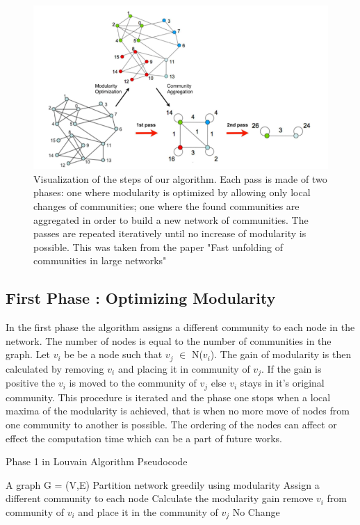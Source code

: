  \begin{figure}[h]

\includegraphics[scale=0.5]{loustep.png}
\caption{\label{loupic} Visualization of the steps of our algorithm. Each pass is made of two phases:
one where modularity is optimized by allowing only local changes of communities;
one where the found communities are aggregated in order to build a new network of
communities. The passes are repeated iteratively until no increase of modularity is
possible. This was taken from the paper "Fast unfolding of communities in large networks" \cite{louvain}}
\centering
\end{figure}

\subsection{First Phase : Optimizing Modularity}
In the first phase the algorithm assigns a different community to each node in the network.  The number of nodes is equal to the number of communities in the graph. Let $v_i$ be be a node such that $v_j$ $\in$ N($v_i$). The gain of modularity is then calculated by removing $v_i$ and placing it in community of $v_j$. If the gain is positive the $v_i$ is moved to the community of $v_j$ else $v_i$ stays in it's original community. This procedure is iterated and the phase one stops when a local maxima of the modularity is achieved, that is when no more move of nodes from one community to another is possible. The ordering of the nodes can affect or effect the computation time which can be a part of future works. 

\begin{algorithm}[H]
\caption{Phase 1 in Louvain Algorithm Pseudocode}
\begin{algorithmic} 
\REQUIRE A graph G = (V,E)
\ENSURE Partition network greedily using modularity
\STATE Assign a different community to each node
\STATE Calculate the modularity gain
\STATE remove $v_i$ from community of $v_i$ and place it in the community of $v_j$
\ELSE 
\STATE No Change
\ENDIF
\ENDFOR
\ENDWHILE
\end{algorithmic}
\end{algorithm}

